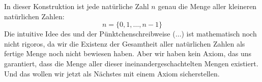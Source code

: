 \begin{math-stroke}


\begin{explanation-of-steps}
In dieser Konstruktion ist jede natürliche Zahl $n$ genau die Menge aller kleineren natürlichen Zahlen:
\[
n = \{0, 1, \dots, n-1\}
\]
Die intuitive Idee des  und der Pünktchenschreibweise ($\dots$) ist mathematisch noch nicht rigoros, da wir die Existenz der Gesamtheit aller natürlichen Zahlen als fertige Menge noch nicht bewiesen haben. Aber wir haben kein Axiom, das uns garantiert, dass die Menge aller dieser ineinandergeschachtelten Mengen existiert. Und das wollen wir jetzt als Nächstes mit einem Axiom sicherstellen.
\end{explanation-of-steps}
\end{math-stroke}

